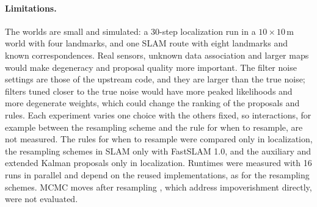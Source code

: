 \paragraph{Limitations.} The worlds are small and simulated: a 30-step localization run in a $10 \times 10$\,m world
with four landmarks, and one SLAM route with eight landmarks and known correspondences. Real sensors, unknown data
association and larger maps would make degeneracy and proposal quality more important. The filter noise settings are
those of the upstream code, and they are larger than the true noise; filters tuned closer to the true noise would have
more peaked likelihoods and more degenerate weights, which could change the ranking of the proposals and rules. Each
experiment varies one choice with the others fixed, so interactions, for example between the resampling scheme and the
rule for when to resample, are not measured. The rules for when to resample were compared only in localization, the
resampling schemes in SLAM only with FastSLAM 1.0, and the auxiliary and extended Kalman proposals only in localization.
Runtimes were measured with 16 runs in parallel and depend on the reused implementations, as for the resampling
schemes. MCMC moves after resampling \cite{gilks2001following}, which address impoverishment directly, were not
evaluated.
